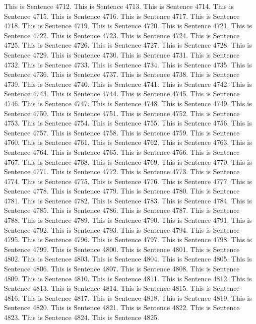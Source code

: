 \documentclass{article}
\begin{document}
This is Sentence 4712.
This is Sentence 4713.
This is Sentence 4714.
This is Sentence 4715.
This is Sentence 4716.
This is Sentence 4717.
This is Sentence 4718.
This is Sentence 4719.
This is Sentence 4720.
This is Sentence 4721.
This is Sentence 4722.
This is Sentence 4723.
This is Sentence 4724.
This is Sentence 4725.
This is Sentence 4726.
This is Sentence 4727.
This is Sentence 4728.
This is Sentence 4729.
This is Sentence 4730.
This is Sentence 4731.
This is Sentence 4732.
This is Sentence 4733.
This is Sentence 4734.
This is Sentence 4735.
This is Sentence 4736.
This is Sentence 4737.
This is Sentence 4738.
This is Sentence 4739.
This is Sentence 4740.
This is Sentence 4741.
This is Sentence 4742.
This is Sentence 4743.
This is Sentence 4744.
This is Sentence 4745.
This is Sentence 4746.
This is Sentence 4747.
This is Sentence 4748.
This is Sentence 4749.
This is Sentence 4750.
This is Sentence 4751.
This is Sentence 4752.
This is Sentence 4753.
This is Sentence 4754.
This is Sentence 4755.
This is Sentence 4756.
This is Sentence 4757.
This is Sentence 4758.
This is Sentence 4759.
This is Sentence 4760.
This is Sentence 4761.
This is Sentence 4762.
This is Sentence 4763.
This is Sentence 4764.
This is Sentence 4765.
This is Sentence 4766.
This is Sentence 4767.
This is Sentence 4768.
This is Sentence 4769.
This is Sentence 4770.
This is Sentence 4771.
This is Sentence 4772.
This is Sentence 4773.
This is Sentence 4774.
This is Sentence 4775.
This is Sentence 4776.
This is Sentence 4777.
This is Sentence 4778.
This is Sentence 4779.
This is Sentence 4780.
This is Sentence 4781.
This is Sentence 4782.
This is Sentence 4783.
This is Sentence 4784.
This is Sentence 4785.
This is Sentence 4786.
This is Sentence 4787.
This is Sentence 4788.
This is Sentence 4789.
This is Sentence 4790.
This is Sentence 4791.
This is Sentence 4792.
This is Sentence 4793.
This is Sentence 4794.
This is Sentence 4795.
This is Sentence 4796.
This is Sentence 4797.
This is Sentence 4798.
This is Sentence 4799.
This is Sentence 4800.
This is Sentence 4801.
This is Sentence 4802.
This is Sentence 4803.
This is Sentence 4804.
This is Sentence 4805.
This is Sentence 4806.
This is Sentence 4807.
This is Sentence 4808.
This is Sentence 4809.
This is Sentence 4810.
This is Sentence 4811.
This is Sentence 4812.
This is Sentence 4813.
This is Sentence 4814.
This is Sentence 4815.
This is Sentence 4816.
This is Sentence 4817.
This is Sentence 4818.
This is Sentence 4819.
This is Sentence 4820.
This is Sentence 4821.
This is Sentence 4822.
This is Sentence 4823.
This is Sentence 4824.
This is Sentence 4825.
\end{document}
